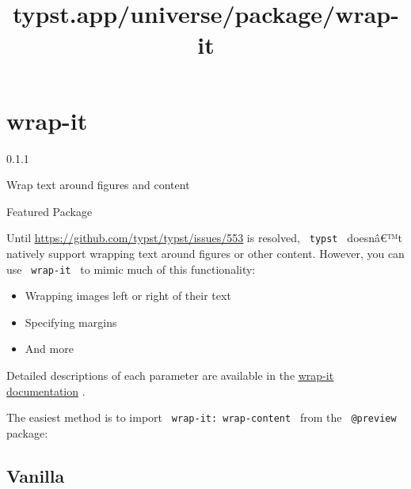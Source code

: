 \title{typst.app/universe/package/wrap-it}

\label{banner}
\section{wrap-it}\label{wrap-it}

{ 0.1.1 }

Wrap text around figures and content

{ } Featured Package

\label{readme}
Until \ul{\ul{\url{https://github.com/typst/typst/issues/553}}} is
resolved, \texttt{\ typst\ } doesnâ€™t natively support wrapping text
around figures or other content. However, you can use
\texttt{\ wrap-it\ } to mimic much of this functionality:

\begin{itemize}
\item
  Wrapping images left or right of their text
\item
  Specifying margins
\item
  And more
\end{itemize}

Detailed descriptions of each parameter are available in the
\ul{\ul{\href{https://github.com/ntjess/wrap-it/blob/main/docs/manual.pdf}{wrap-it
documentation}}} .

The easiest method is to import \texttt{\ wrap-it:\ wrap-content\ } from
the \texttt{\ @preview\ } package:

\begin{Shaded}
\begin{Highlighting}[]
\end{Highlighting}
\end{Shaded}

\subsection{Vanilla}\label{vanilla}

\begin{Shaded}
\begin{Highlighting}[]
\NormalTok{)}
\end{Highlighting}
\end{Shaded}

